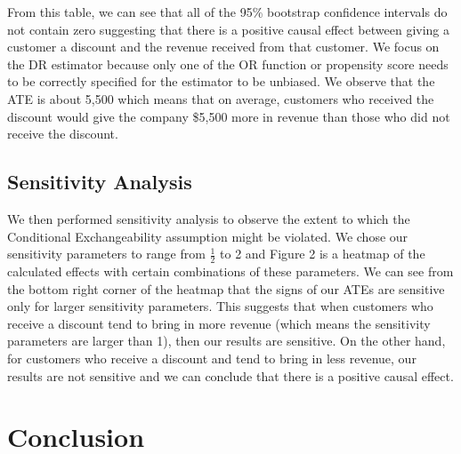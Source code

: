 \documentclass[10pt]{article}
\begin{document}
From this table, we can see that all of the 95\% bootstrap confidence intervals do not contain zero suggesting that there is a positive causal effect between giving a customer a discount and the revenue received from that customer. We focus on the DR estimator because only one of the OR function or propensity score needs to be correctly specified for the estimator to be unbiased. We observe that the ATE is about 5,500 which means that on average, customers who received the discount would give the company \$5,500 more in revenue than those who did not receive the discount.

\subsection{Sensitivity Analysis}
We then performed sensitivity analysis to observe the extent to which the Conditional Exchangeability assumption might be violated. We chose our sensitivity parameters to range from $\frac{1}{2}$ to 2 and Figure 2 is a heatmap of the calculated effects with certain combinations of these parameters. We can see from the bottom right corner of the heatmap that the signs of our ATEs are sensitive only for larger sensitivity parameters. This suggests that when customers who receive a discount tend to bring in more revenue (which means the sensitivity parameters are larger than 1), then our results are sensitive. On the other hand, for customers who receive a discount and tend to bring in less revenue, our results are not sensitive and we can conclude that there is a positive causal effect.
\section{Conclusion}
\end{document}
